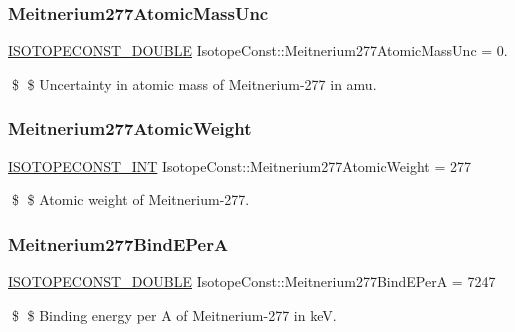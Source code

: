 \subsubsection{\texorpdfstring{Meitnerium277\+Atomic\+Mass\+Unc}{Meitnerium277AtomicMassUnc}}
{\footnotesize\ttfamily \mbox{\hyperlink{group___isotope_const-_macros_ga8f45a7272ce02c0b4c65c44636ed719a}{I\+S\+O\+T\+O\+P\+E\+C\+O\+N\+S\+T\+\_\+\+D\+O\+U\+B\+LE}} Isotope\+Const\+::\+Meitnerium277\+Atomic\+Mass\+Unc = 0.}

\$ \$ Uncertainty in atomic mass of Meitnerium-\/277 in amu. \mbox{\label{group___isotope_const-_meitnerium-_mt277_ga3e138e6caa1a0b9a889f2375c9d5e241}} 
\subsubsection{\texorpdfstring{Meitnerium277\+Atomic\+Weight}{Meitnerium277AtomicWeight}}
{\footnotesize\ttfamily \mbox{\hyperlink{group___isotope_const-_macros_ga5f18360b3e99483a35c32d789e62621c}{I\+S\+O\+T\+O\+P\+E\+C\+O\+N\+S\+T\+\_\+\+I\+NT}} Isotope\+Const\+::\+Meitnerium277\+Atomic\+Weight = 277}

\$ \$ Atomic weight of Meitnerium-\/277. \mbox{\label{group___isotope_const-_meitnerium-_mt277_gae8a8e1b57254229cc175a41dda01320d}} 
\subsubsection{\texorpdfstring{Meitnerium277\+Bind\+E\+PerA}{Meitnerium277BindEPerA}}
{\footnotesize\ttfamily \mbox{\hyperlink{group___isotope_const-_macros_ga8f45a7272ce02c0b4c65c44636ed719a}{I\+S\+O\+T\+O\+P\+E\+C\+O\+N\+S\+T\+\_\+\+D\+O\+U\+B\+LE}} Isotope\+Const\+::\+Meitnerium277\+Bind\+E\+PerA = 7247}

\$ \$ Binding energy per A of Meitnerium-\/277 in keV. \mbox{\label{group___isotope_const-_meitnerium-_mt277_ga5209597515550fa7a7723e53aaa29bc7}} 
